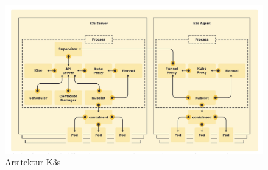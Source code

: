 \begin{figure}[ht]
  \centering
  \includegraphics[width=1\textwidth]{resources/chapter-2/arsitektur-k3s.jpg}
  \caption{Arsitektur K3s \parencite{k3s}}
  \label{fig:arsitektur-k3s}
\end{figure}

\pagebreak